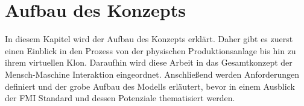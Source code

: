 \chapter{Aufbau des Konzepts}\label{cha:AufbauDesKonzepts}
In diesem Kapitel wird der Aufbau des Konzepts erklärt. Daher gibt es zuerst einen Einblick in den Prozess von der physischen Produktionsanlage bis hin zu ihrem virtuellen Klon. Daraufhin wird diese Arbeit in das Gesamtkonzept der Mensch-Maschine Interaktion eingeordnet. Anschließend werden Anforderungen definiert und der grobe Aufbau des Modells erläutert, bevor in einem Ausblick der FMI Standard und dessen Potenziale thematisiert werden.


